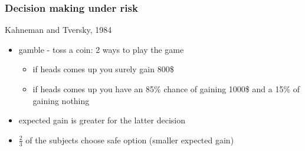 \documentclass[]{beamer}
\begin{document}
\begin{frame}
\frametitle{Decision making under risk}
\begin{overlayarea}{115mm}{80mm}
 Kahneman and Tversky, 1984
\begin{itemize}
 \item gamble - toss a coin: 2 ways to play the game
 \begin{itemize}
  \item if heads comes up you surely gain 800\$
  \item if heads comes up you have an 85\% chance of gaining 1000\$ and a 15\% of gaining nothing 
 \end{itemize}
 \item<2-> expected gain is greater for the latter decision
 \item<2-> $\frac{2}{3}$ of the subjects choose safe option (smaller expected gain)   
\end{itemize}

\end{overlayarea}
\end{frame}
\end{document}
